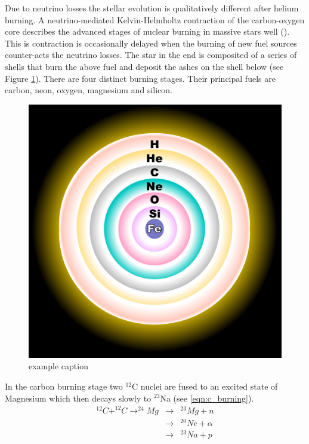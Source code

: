 Due to neutrino losses the stellar evolution is qualitatively different after helium burning. A neutrino-mediated Kelvin-Helmholtz contraction of the carbon-oxygen core describes the advanced stages of nuclear burning in massive stars well (\citet{2002RvMP...74.1015W}). This is contraction is occasionally delayed when the burning of new fuel sources counter-acts the neutrino losses. The star in the end is composited of a series of shells that burn the above fuel and deposit the ashes on the shell below (see Figure \ref{fig:fusion_shells}). There are four distinct burning stages. Their principal fuels are carbon, neon, oxygen, magnesium and silicon.

\begin{figure}[htbp] %
   \centering
   \includegraphics[width=\textwidth]{chapter_intro/plots/fusion_shells.pdf} 
   \caption{example caption}
   \label{fig:fusion_shells}
\end{figure}


In the carbon burning stage two $^{12}$C nuclei are fused to an excited state of Magnesium which then decays slowly to $^{23}$Na (see \ref{eqn:c_burning}).
\begin{eqnarray}
^{12}C+^{12}C\rightarrow^{24}Mg&\rightarrow&^{23}Mg+n \nonumber \\
	&\rightarrow&^{20}Ne + \alpha \nonumber \\
	&\rightarrow&^{23}Na +p \nonumber \\
	\label{eqn:c_burning}
\end{eqnarray}


